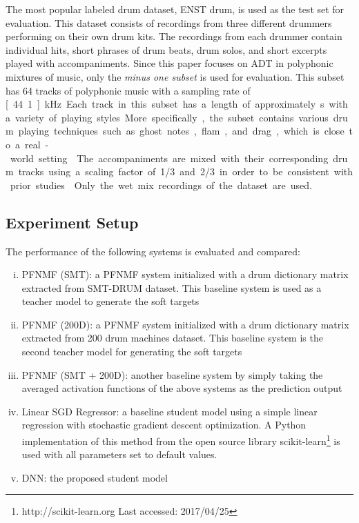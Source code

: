 \documentclass{article}
\begin{document}
The most popular labeled drum dataset, ENST drum\cite{Gillet2006}, is used as the test set for evaluation. This dataset consists of recordings from three different drummers performing on their own drum kits. The recordings from each drummer contain individual hits, short phrases of drum beats, drum solos, and short excerpts played with accompaniments. Since this paper focuses on ADT in polyphonic mixtures of music, only the \textit{minus one subset} is used for evaluation. This subset has 64 tracks of polyphonic music with a sampling rate of \unit[44.1]{kHz}. Each track in this subset has a length of approximately \unit[70]{s} with a variety of playing styles. More specifically, the subset contains various drum playing techniques such as ghost notes, flam, and drag, which is close to a real-world setting \cite{Wu2016}. The accompaniments are mixed with their corresponding drum tracks using a scaling factor of 1/3 and 2/3 in order to be consistent with prior studies \cite{Paulus2009a, Wu2015a, Southall2016}. Only the wet mix recordings of the dataset are used. 




\subsection{Experiment Setup}
The performance of the following systems is evaluated and compared: 
\begin{enumerate}[(i)]
\item   PFNMF (SMT): a PFNMF system initialized with a drum dictionary matrix extracted from SMT-DRUM dataset. This baseline system is used as a teacher model to generate the soft targets
\item   PFNMF (200D): a PFNMF system initialized with a drum dictionary matrix extracted from 200 drum machines dataset. This baseline system is the second teacher model for generating the soft targets
\item   PFNMF (SMT + 200D): another baseline system by simply taking the averaged activation functions of the above systems as the prediction output
\item   Linear SGD Regressor: a baseline student model using a simple linear regression with stochastic gradient descent optimization. A Python implementation of this method from the open source library scikit-learn\footnote{http://scikit-learn.org Last accessed: 2017/04/25} is used with all parameters set to default values.
\item   DNN: the proposed student model 
\end{enumerate}
\end{document}
